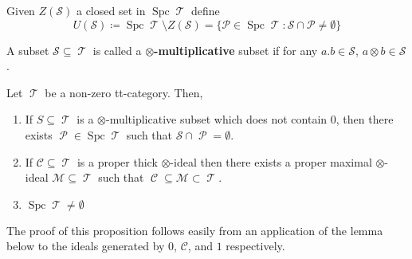\documentclass[11pt]{article}
\DeclareMathOperator{\CC}{\mathcal{C}}
\DeclareMathOperator{\TT}{\mathcal{T}}
\DeclareMathOperator{\cP}{\mathcal{P}}
\DeclareMathOperator{\spc}{Spc}
\begin{document}
\begin{defn}
Given $Z(\mathcal{S})$ a closed set in $\spc \TT$ define 
\[
	U(\mathcal{S})\coloneqq \spc \TT \setminus Z(\mathcal{S}) = \{\mathcal{P} \in \spc \TT: \mathcal{S} \cap \mathcal{P} \not = \emptyset\}
\] 
\end{defn}

\begin{defn}
A subset $\mathcal{S} \subseteq \TT$ is called a \textbf{$\otimes$-multiplicative} subset if for any $a.b \in \mathcal{S}$, $a \otimes b \in \mathcal{S}$.
\end{defn}


\begin{prop}\label{multsubprops}
Let $\TT$ be a non-zero tt-category. Then, 
\begin{enumerate}[1.]
\item If $S \subseteq \TT$ is a $\otimes$-multiplicative subset which does not contain $0$, then there exists $\cP \in \spc \TT$ such that $\mathcal{S} \cap \cP = \emptyset$.
\item If $\mathcal{C} \subseteq \TT$ is a proper thick $\otimes$-ideal then there exists a proper maximal $\otimes$-ideal $\mathcal{M} \subseteq \TT$ such that $\CC \subseteq \mathcal{M} \subset \TT$.
	\item $\spc \TT \not = \emptyset$
\end{enumerate}
\end{prop}

The proof of this proposition follows easily from an application of the lemma below to the ideals generated by $0$, $\mathcal{C}$, and $1$ respectively.
\end{document}

